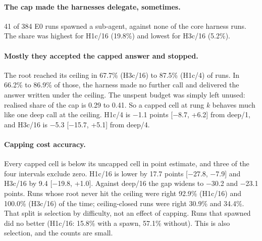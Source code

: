 \documentclass[11pt]{article}
\begin{document}
\begin{table}[h]
\centering\small
{}
\caption{E0 cells: macro accuracy and paired differences in points. ``Deep at ceiling'' is one forced deep call
with the root ceiling as its budget. The last column is the share of ceiling-closed runs in which the harness
made no further call.}
\label{tab:e0}
\end{table}

\paragraph{The cap made the harnesses delegate, sometimes.} 41 of 384 E0 runs
spawned a sub-agent, against none of the core harness runs. The share was highest for H1c/16
(19.8\%) and lowest for H3c/16 (5.2\%).

\paragraph{Mostly they accepted the capped answer and stopped.} The root reached its ceiling in
67.7\% (H3c/16) to 87.5\% (H1c/4) of runs.
In 66.2\% to 86.9\% of
those, the harness made no further call and delivered the answer written under the ceiling. The unspent budget was
simply left unused: realised share of the cap is 0.29 to
0.41. So a capped cell at rung $k$ behaves much like one deep call at the ceiling. H1c/4 is
$-$1.1 points [$-$8.7, +6.2] from deep/1, and
H3c/16 is $-$5.3 [$-$15.7, +5.1] from deep/4.

\paragraph{Capping cost accuracy.} Every capped cell is below its uncapped cell in point estimate, and three of the four intervals exclude zero. H1c/16 is lower by
17.7 points [$-$27.8, $-$7.9] and H3c/16 by
9.4 [$-$19.8, +1.0]. Against deep/16 the gap
widens to $-$30.2 and $-$23.1 points. Runs whose root never hit
the ceiling were right 92.9\% (H1c/16) and 100.0\%
(H3c/16) of the time; ceiling-closed runs were right 30.9\% and
34.4\%. That split is selection by difficulty, not an effect of capping. Runs
that spawned did no better (H1c/16: 15.8\% with a spawn,
57.1\% without). This is also selection, and the counts are small.
\end{document}
